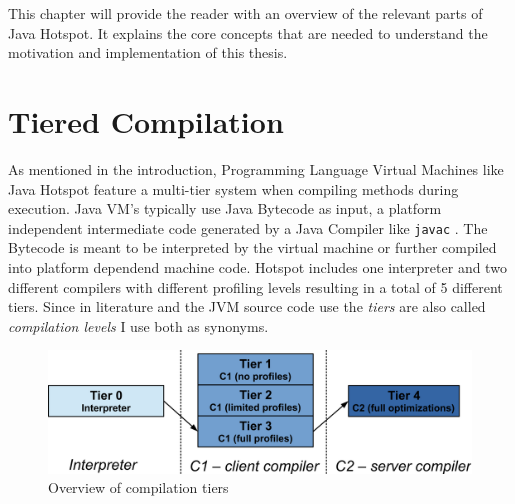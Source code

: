 This chapter will provide the reader with an overview of the relevant parts of Java Hotspot. It explains the core concepts that are needed to understand the motivation and implementation of this thesis.

\section{Tiered Compilation}
\label{sec:tiered}
As mentioned in the introduction, Programming Language Virtual Machines like Java Hotspot feature a multi-tier system when compiling methods during execution. 
Java VM's typically use Java Bytecode as input, a platform independent intermediate code generated by a Java Compiler like \texttt{javac} \cite{javac}.
The Bytecode is meant to be interpreted by the virtual machine or further compiled into platform dependend machine code.
Hotspot includes one interpreter and two different compilers with different profiling levels resulting in a total of 5 different tiers. Since in literature and the JVM source code use the \textit{tiers} are also called \textit{compilation levels} I use both as synonyms. 
\begin{figure}[ht]
  \begin{center}
    \centering
    \includegraphics{figures/hs_tiers.png}
    \caption{Overview of compilation tiers}
    \label{f:hs_tiers}
  \end{center}
\end{figure}

